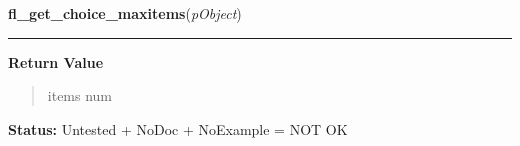     \label{xformslib:library:fl_get_choice_maxitems}

    \vspace{0.5ex}

\hspace{.8\funcindent}\begin{boxedminipage}{\funcwidth}

    \raggedright \textbf{fl\_get\_choice\_maxitems}(\textit{pObject})

    \vspace{-1.5ex}

    \rule{\textwidth}{0.5\fboxrule}
\setlength{\parskip}{2ex}
\setlength{\parskip}{1ex}
      \textbf{Return Value}
    \vspace{-1ex}

      \begin{quote}
      items num

      \end{quote}

\textbf{Status:} Untested + NoDoc + NoExample = NOT OK



    \end{boxedminipage}

    \label{xformslib:library:fl_get_choice_text}

    \vspace{0.5ex}

